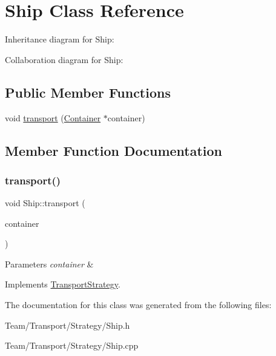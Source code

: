 \hypertarget{classShip}{}\section{Ship Class Reference}
\label{classShip}


Inheritance diagram for Ship\+:


Collaboration diagram for Ship\+:
\subsection*{Public Member Functions}
\begin{DoxyCompactItemize}
\item 
void \hyperlink{classShip_a8b60ca34490dd8ef1c93888fa61c9472}{transport} (\hyperlink{classContainer}{Container} $\ast$container)
\end{DoxyCompactItemize}


\subsection{Member Function Documentation}
\mbox{\label{classShip_a8b60ca34490dd8ef1c93888fa61c9472}} 
\subsubsection{\texorpdfstring{transport()}{transport()}}
{\footnotesize\ttfamily void Ship\+::transport (\begin{DoxyParamCaption}\item[{\hyperlink{classContainer}{Container} $\ast$}]{container }\end{DoxyParamCaption})\hspace{0.3cm}{\ttfamily [virtual]}}


\begin{DoxyParams}{Parameters}
{\em container} & \\
\hline
\end{DoxyParams}


Implements \hyperlink{classTransportStrategy_ab5659f9d5d352ba0a23f1e99edd3d488}{Transport\+Strategy}.



The documentation for this class was generated from the following files\+:\begin{DoxyCompactItemize}
\item 
Team/\+Transport/\+Strategy/Ship.\+h\item 
Team/\+Transport/\+Strategy/Ship.\+cpp\end{DoxyCompactItemize}
